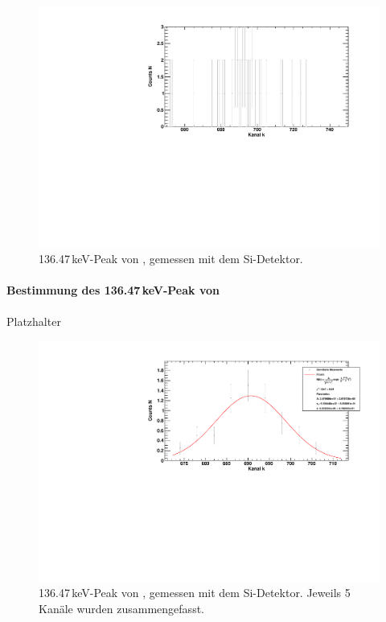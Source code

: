 \begin{figure}[H]
\begin{center}
  \includegraphics[width=\textwidth]{../img/part3/Co-Si_01.pdf}
  \caption{136.47\,keV-Peak von \co, gemessen mit dem Si-Detektor.}
  \label{img:co:si:peak1}
\end{center}
\end{figure}

\paragraph{Bestimmung des 136.47\,keV-Peak von \co}
Platzhalter

\begin{figure}[H]
\begin{center}
  \includegraphics[width=\textwidth]{../img/part3/Co-Si_01_mergedbins.pdf}
  \caption{136.47\,keV-Peak von \co, gemessen mit dem Si-Detektor. Jeweils 5 Kanäle wurden zusammengefasst.}
  \label{img:co:si:peak1}
\end{center}
\end{figure}

